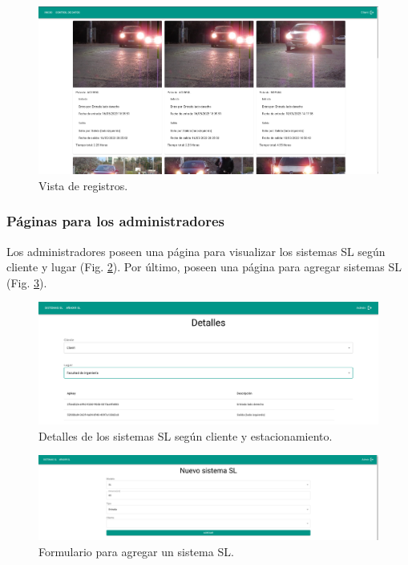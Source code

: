 \begin{figure}[!bth]
    \centering
    \includegraphics[width=.8\textwidth]{imgs/server/registers.png}
    \caption{Vista de registros.}
    \label{fig:registers}
\end{figure}



\subsubsection{Páginas para los administradores}

Los administradores poseen una página para visualizar los sistemas SL según cliente y lugar (Fig. \ref{fig:admin-details}). Por último, poseen una página para agregar sistemas SL (Fig. \ref{fig:add-barrier}).

\begin{figure}[!bth]
    \centering
    \includegraphics[width=.8\textwidth]{imgs/server/admin-details.png}
    \caption{Detalles de los sistemas SL según cliente y estacionamiento.}
    \label{fig:admin-details}
\end{figure}

\begin{figure}[!bth]
    \centering
    \includegraphics[width=.8\textwidth]{imgs/server/add-barrier.png}
    \caption{Formulario para agregar un sistema SL.}
    \label{fig:add-barrier}
\end{figure}

